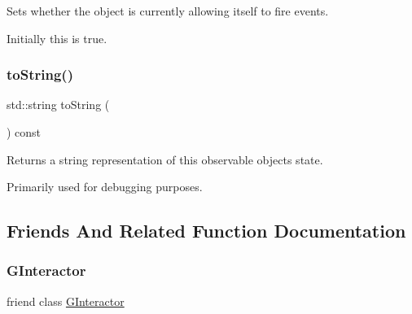 Sets whether the object is currently allowing itself to fire events. 

Initially this is true. \mbox{\label{classsgl_1_1GObservable_a1fe5121d6528fdea3f243321b3fa3a49}} 
\subsubsection{\texorpdfstring{to\+String()}{toString()}}
{\footnotesize\ttfamily std\+::string to\+String (\begin{DoxyParamCaption}{ }\end{DoxyParamCaption}) const\hspace{0.3cm}{\ttfamily [virtual]}}



Returns a string representation of this observable object\textquotesingle{}s state. 

Primarily used for debugging purposes. 

\subsection{Friends And Related Function Documentation}
\mbox{\label{classsgl_1_1GObservable_a054e99eaa992da5c1a77c8d7b3817788}} 
\subsubsection{\texorpdfstring{G\+Interactor}{GInteractor}}
{\footnotesize\ttfamily friend class \mbox{\hyperlink{classsgl_1_1GInteractor}{G\+Interactor}}\hspace{0.3cm}{\ttfamily [friend]}}

